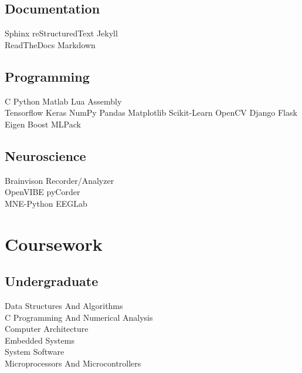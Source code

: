 \documentclass[]{deedy-resume-openfont}
\begin{document}
\begin{minipage}[t]{0.33\textwidth}
\subsection{Documentation}
Sphinx \textbullet{} reStructuredText \textbullet{} Jekyll \\
ReadTheDocs \textbullet{} Markdown \\
\sectionsep

\subsection{Programming}
C \textbullet{} Python \textbullet{} Matlab \textbullet{} Lua \textbullet{} Assembly \\ 
Tensorflow \textbullet{} Keras \textbullet{} NumPy \textbullet{} Pandas
Matplotlib \textbullet{} Scikit-Learn \textbullet{} OpenCV \textbullet{} Django \textbullet{} Flask \\
Eigen \textbullet{} Boost \textbullet{} MLPack 
\sectionsep

\subsection{Neuroscience}
Brainvison Recorder/Analyzer\\ OpenVIBE \textbullet{} pyCorder\\
MNE-Python \textbullet{} EEGLab
\sectionsep


\section{Coursework}

\subsection{Undergraduate}
Data Structures And Algorithms \\
C Programming And Numerical Analysis \\
Computer Architecture \\
Embedded Systems\\
System Software \\
Microprocessors And Microcontrollers\\
\sectionsep


\end{minipage}
\end{document}
